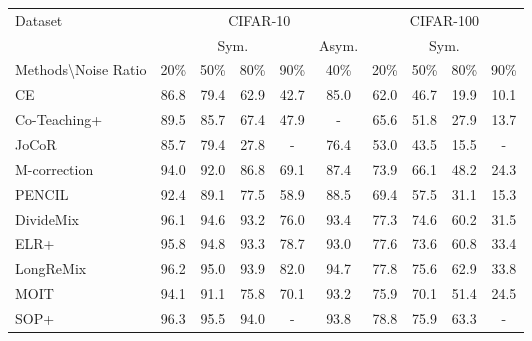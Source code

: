\documentclass{article}
\begin{document}
\begin{table*}[!t]
	\centering
 \small
\tabcolsep=0.4cm
	\begin{tabular}{l || cccc | c||cccc} 
		\toprule	 	

			\multirow{2}{*}{Dataset } &\multicolumn{5}{c||}{CIFAR-10}&\multicolumn{4}{c}{CIFAR-100}\\
			\cmidrule{2-10}
			 &   \multicolumn{4}{c|}{Sym.}& Asym. & \multicolumn{4}{c}{Sym.}\\
			\midrule
			Methods\textbackslash Noise Ratio  & 20\% & 50\%& 80\% & 90\% &\multicolumn{1}{c||}{40\%}&20\% & 50\%& 80\% & 90\% \\
			\midrule
			
			{CE}	 &86.8&79.4	&62.9&42.7&85.0 & 62.0  & 46.7&19.9  &10.1 \\
			
			
			{Co-Teaching+}	 & 89.5 & 85.7 & 67.4 & 47.9 & - & 65.6  & 51.8 & 27.9  & 13.7 \\

			
            {JoCoR}	& 85.7& 79.4	&27.8& - &76.4 &53.0  &43.5& 15.5  & -  \\	             						 	
			
            {M-correction} & 94.0 & 92.0	&86.8&69.1&87.4 &73.9  &66.1 &48.2  &24.3 \\	             						 	
			

            {PENCIL}	&92.4&89.1	&77.5&58.9&88.5 &69.4  &57.5&31.1  &15.3 \\	             						 	
			
            

			{DivideMix}	&96.1&94.6	&93.2&76.0&93.4 & 77.3  & 74.6&60.2  &31.5 \\	             						 	
			
   
			{ELR+}	&95.8 & 94.8	&93.3&78.7&93.0 &77.6  &73.6 &60.8  &33.4 \\	    
   
			{LongReMix}	&96.2&95.0	&93.9&82.0&94.7 &77.8  &75.6&62.9  &33.8 \\	             						 	
			

           
   
			{MOIT}&94.1&91.1	&75.8&70.1& 93.2  &75.9  &70.1 &51.4  &24.5 \\	             						 	
			


  
			{SOP+}	&96.3  & 95.5 &  94.0& - &93.8 &78.8  & 75.9 &  63.3  & - \\	   


\end{tabular}
\end{table*}
\end{document}
